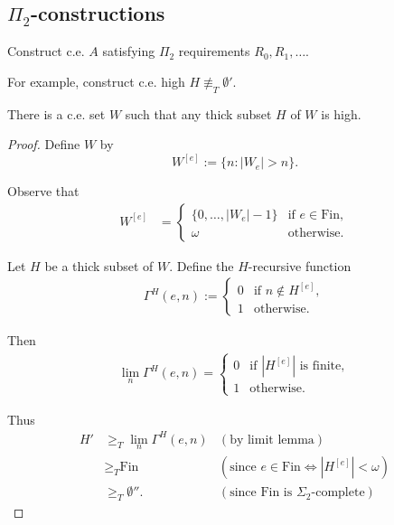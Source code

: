 \subsection{$\Pi_2$-constructions}
  \begin{goal}
    Construct c.e. $A$ satisfying $\Pi_2$ requirements $R_0,R_1,\ldots$.
  \end{goal}

  For example, construct c.e. high $H\not\equiv_T\emptyset'$.
  \begin{lemma}[Thickness]
    There is a c.e. set $W$ such that any thick subset $H$ of $W$ is high.
  \end{lemma}
  \begin{proof}
    Define $W$ by
    \[W^{[e]} :=\{n: |W_e|>n\}.\]

    Observe that
    \begin{align*}
      W^{[e]}&=
      \begin{cases}
        \{0,\ldots,|W_e|-1\} &\text{if } e\in\text{Fin},\\
        \omega &\text{otherwise}.
      \end{cases}
    \end{align*}

    Let $H$ be a thick subset of $W$. Define the $H$-recursive function
    \begin{align*}
      \Gamma^H(e,n):=
      \begin{cases}
        0 &\text{if } n\not\in H^{[e]},\\
        1 &\text{otherwise}.
      \end{cases}
    \end{align*}

    Then
    \begin{align*}
      \lim_n \Gamma^H(e,n)=
      \begin{cases}
        0 &\text{if } |H^{[e]}| \text{ is finite},\\
        1 &\text{otherwise}.
      \end{cases}
    \end{align*}

    Thus
    \begin{align*}
      H' &\geq_T \lim_n \Gamma^H(e,n) &(\text{by limit lemma})\\
      &\geq_T \text{Fin} &(\text{since } e\in\text{Fin} \Leftrightarrow
        |H^{[e]}|<\omega)\\
      &\geq_T \emptyset''. &(\text{since Fin is } \Sigma_2\text{-complete})
    \end{align*}
  \end{proof}

